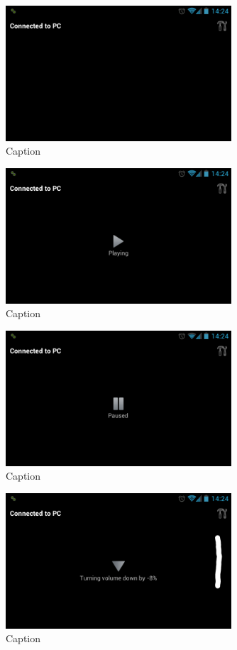 \documentclass[a4paper,12pt]{article}
\begin{document}
\begin{figure}[H]
\centering
\includegraphics[width=0.75\textwidth]{Screenshot_6.png}
\caption{Caption}
\end{figure}

\begin{figure}[H]
\centering
\includegraphics[width=0.75\textwidth]{Screenshot_7.png}
\caption{Caption}
\end{figure}

\begin{figure}[H]
\centering
\includegraphics[width=0.75\textwidth]{Screenshot_8.png}
\caption{Caption}
\end{figure}

\begin{figure}[H]
\centering
\includegraphics[width=0.75\textwidth]{Screenshot_9.png}
\caption{Caption}
\end{figure}
\end{document}
